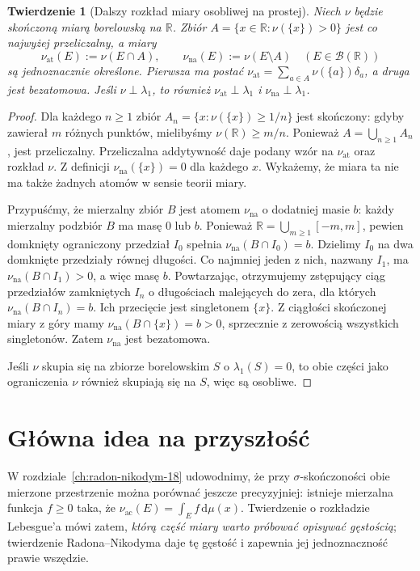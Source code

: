 \documentclass[11pt,a4paper,oneside]{book}
\numberwithin{equation}{chapter}
\theoremstyle{plain}
\newtheorem{twierdzenie}{Twierdzenie}[chapter]
\theoremstyle{definition}
\theoremstyle{remark}
\begin{document}
\begin{twierdzenie}[Dalszy rozkład miary osobliwej na prostej]
\label{thm:atomic-cont-singular-17}
Niech $\nu$ będzie skończoną miarą borelowską na
$\mathbb R$. Zbiór
$A=\{x\in\mathbb R:\nu(\{x\})>0\}$ jest co najwyżej
przeliczalny, a miary
\[
 \nu_{\mathrm{at}}(E):=\nu(E\cap A),\qquad
 \nu_{\mathrm{na}}(E):=\nu(E\setminus A)
 \quad(E\in\mathcal B(\mathbb R))
\]
są jednoznacznie określone. Pierwsza ma postać
$\nu_{\mathrm{at}}=\sum_{a\in A}\nu(\{a\})\delta_a$,
a druga jest bezatomowa. Jeśli $\nu\perp\lambda_1$,
to również $\nu_{\mathrm{at}}\perp\lambda_1$ i
$\nu_{\mathrm{na}}\perp\lambda_1$.
\end{twierdzenie}
\begin{proof}
Dla każdego $n\ge1$ zbiór
$A_n=\{x:\nu(\{x\})\ge1/n\}$ jest skończony:
gdyby zawierał $m$ różnych punktów, mielibyśmy
$\nu(\mathbb R)\ge m/n$. Ponieważ
$A=\bigcup_{n\ge1}A_n$, jest przeliczalny.
Przeliczalna addytywność daje podany wzór na
$\nu_{\mathrm{at}}$ oraz rozkład $\nu$.
Z definicji $\nu_{\mathrm{na}}(\{x\})=0$ dla
każdego $x$. Wykażemy, że miara ta nie ma także
żadnych atomów w sensie teorii miary.

Przypuśćmy, że mierzalny zbiór $B$ jest atomem
$\nu_{\mathrm{na}}$ o dodatniej masie $b$:
każdy mierzalny podzbiór $B$ ma masę $0$ lub $b$.
Ponieważ $\mathbb R=\bigcup_{m\ge1}[-m,m]$,
pewien domknięty ograniczony przedział $I_0$
spełnia $\nu_{\mathrm{na}}(B\cap I_0)=b$.
Dzielimy $I_0$ na dwa domknięte przedziały równej
długości. Co najmniej jeden z nich, nazwany $I_1$,
ma $\nu_{\mathrm{na}}(B\cap I_1)>0$, a więc masę $b$.
Powtarzając, otrzymujemy zstępujący ciąg przedziałów
zamkniętych $I_n$ o długościach malejących do zera,
dla których $\nu_{\mathrm{na}}(B\cap I_n)=b$.
Ich przecięcie jest singletonem $\{x\}$.
Z ciągłości skończonej miary z góry mamy
$\nu_{\mathrm{na}}(B\cap\{x\})=b>0$,
sprzecznie z zerowością wszystkich singletonów.
Zatem $\nu_{\mathrm{na}}$ jest bezatomowa.

Jeśli $\nu$ skupia się na zbiorze borelowskim $S$
o $\lambda_1(S)=0$, to obie części jako ograniczenia
$\nu$ również skupiają się na $S$, więc są osobliwe.
\end{proof}

\section{Główna idea na przyszłość}
W rozdziale~\ref{ch:radon-nikodym-18} udowodnimy, że przy
$\sigma$-skończoności obie mierzone przestrzenie można porównać
jeszcze precyzyjniej: istnieje mierzalna funkcja
$f\ge0$ taka, że
$\nu_{\mathrm{ac}}(E)=\int_E f\,\mathrm d\mu(x)$.
Twierdzenie o rozkładzie Lebesgue'a mówi zatem,
\emph{którą część miary warto próbować opisywać gęstością};
twierdzenie Radona--Nikodyma daje tę gęstość i
zapewnia jej jednoznaczność prawie wszędzie.
\end{document}
